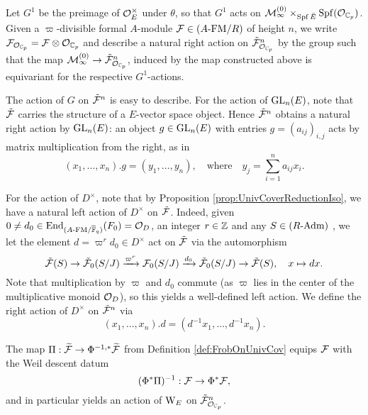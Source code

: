 \documentclass[../main.tex]{subfiles}
\begin{document}
Let $G^1$ be the preimage of $\mathcal{O}_E^\times$ under $\theta$, so that 
$G^1$ acts on $\mathcal{M}_{\infty}^{(0)} \times_{\operatorname{Spf} {\breve {E}}} \operatorname{Spf}(\mathcal{O}_{\mathbb{C}_p})$. 
Given a $\varpi$-divisible formal $A$-module $\mathcal{F} \in {({A}\text-\allowbreak\mathrm{FM}/{R})}$ of height
$n$, we write $\mathcal{F}_{\mathcal{O}_{\mathbb{C}_p}} = \mathcal{F} \otimes \mathcal{O}_{\mathbb{C}_p}$ and describe a natural right
action on $\tilde {\mathcal{F}}_{\mathcal{O}_{\mathbb{C}_p}}^n$ by the group 
such that the map $\mathcal{M}_{\infty}^{(0)} \to \tilde {\mathcal{F}}_{\mathcal{O}_{\mathbb{C}_p}}^n$,
induced by the map constructed above is equivariant for the respective
$G^1$-actions.

The action of $G$ on $\tilde {\mathcal{F}}^n$ is easy to describe. For the action of
$\operatorname{GL}_n(E)$, note that $\tilde {\mathcal{F}}$ carries the structure of a $E$-vector space
object. Hence $\tilde {\mathcal{F}}^n$ obtains a natural right action by $\operatorname{GL}_n(E)$: an
object $g \in \operatorname{GL}_n(E)$ with entries $g = (a_{ij})_{i,j}$ acts by matrix
multiplication from the right, as in 
\begin{equation}\label{eq:UnivCoverGLnAction}
  (x_1, \dots, x_n).g = (y_1, \dots, y_n), \quad
  \text{where} \quad y_j = \sum_{i=1}^n a_{ij} x_i. 
\end{equation}

For the action of $D^\times$, note that by Proposition
\ref{prop:UnivCoverReductionIso}, we have 
a natural left action of $D^\times$ on $\tilde {\mathcal{F}}$. 
Indeed, given $0 \neq d_0 \in \operatorname{End}_{{({A}\text-\allowbreak\mathrm{FM}/{{\overline {\mathbb{F}}_q}})}}(F_0) = \mathcal{O}_D$, an
integer $r \in \mathbb{Z}$ and any $S \in {({R}\text-\allowbreak\mathrm{Adm})}$ , 
we let the element $d = \varpi^r d_0 \in D^\times$ act on $\tilde {\mathcal{F}}$ via the
automorphism
\begin{equation*}
  \tilde {\mathcal{F}}(S) \to \tilde {\mathcal{F}}_0(S/J) \xrightarrow{\varpi^{r}} \mathcal{F}_0(S/J) \xrightarrow{d_0}
  \tilde {\mathcal{F}}_0(S/J) \to \tilde {\mathcal{F}}(S), \quad x \mapsto dx.
\end{equation*}
Note that multiplication by $\varpi$ and $d_0$ commute (as $\varpi$ lies in the 
center of the multiplicative monoid $\mathcal{O}_D$), so this yields a well-defined
left action. We define the right action of $D^\times$ on $\tilde {\mathcal{F}}^n$ via
\begin{equation*}
  (x_1, \dots, x_n).d = (d^{-1} x_1, \dots, d^{-1} x_n).
\end{equation*}


The map $\Pi: \widetilde{\mathcal{F}} \to \Phi^{-1,*}\widetilde{\mathcal{F}}$ from Definition 
\ref{def:FrobOnUnivCov} equips $\mathcal{F}$ with the Weil descent datum
\begin{equation*}
  (\Phi^*{\Pi})^{-1}: \mathcal{F} \to \Phi^*\mathcal{F},
\end{equation*}
and in particular yields an action of $\mathrm W_E$ on $\tilde {\mathcal{F}}_{\mathcal{O}_{\mathbb{C}_p}}^n$. 
\end{document}
